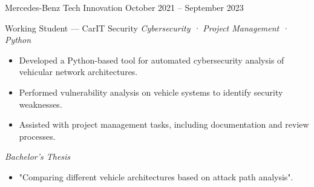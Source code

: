 \subsectionspacing


{\companyfont Mercedes-Benz Tech Innovation} \hfill \textcolor{shadeGray}{October 2021 – September 2023}

{\rolefont Working Student — CarIT Security} \hfill
\textit{\textcolor{shadeGray}{Cybersecurity · Project Management · Python}}

\begin{itemize}
    \item Developed a Python-based tool for automated cybersecurity analysis of vehicular network architectures.
    \item Performed vulnerability analysis on vehicle systems to identify security weaknesses.
    \item Assisted with project management tasks, including documentation and review processes.
\end{itemize}
\textit{Bachelor's  Thesis}
\begin{itemize}
    \item "Comparing different vehicle architectures based on attack path analysis".
\end{itemize}

\subsectionspacing
\subsectionspacing
